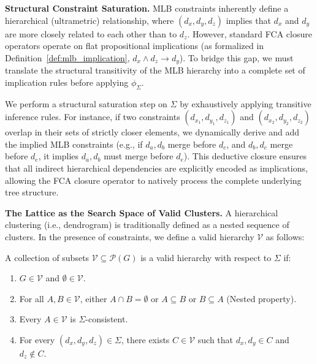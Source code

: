 \textbf{Structural Constraint Saturation.} 
MLB constraints inherently define a hierarchical (ultrametric) relationship, where $(d_x,d_y,d_z)$ implies that $d_x$ and $d_y$ are more closely related to each other than to $d_z$. However, standard FCA closure operators operate on flat propositional implications (as formalized in Definition~\eqref{def:mlb_implication}, $d_x \land d_z \rightarrow d_y$). To bridge this gap, we must translate the structural transitivity of the MLB hierarchy into a complete set of implication rules before applying $\phi_\Sigma$. 

We perform a structural saturation step on $\Sigma$ by exhaustively applying transitive inference rules. For instance, if two constraints $(d_{x_1}, d_{y_1}, d_{z_1})$ and $(d_{x_2}, d_{y_2}, d_{z_2})$ overlap in their sets of strictly closer elements, we dynamically derive and add the implied MLB constraints (e.g., if $d_{a}, d_{b}$ merge before $d_{c}$, and $d_{b}, d_{c}$ merge before $d_{e}$, it implies $d_{a}, d_{b}$ must merge before $d_{e}$). This deductive closure ensures that all indirect hierarchical dependencies are explicitly encoded as implications, allowing the FCA closure operator to natively process the complete underlying tree structure.

\textbf{The Lattice as the Search Space of Valid Clusters.} 
A hierarchical clustering (i.e., dendrogram) is traditionally defined as a nested sequence of clusters.
In the presence of constraints, we define a valid hierarchy $\mathcal{V}$ as follows:

\begin{definition}[Valid Hierarchy] %
    \label{def:valid_hierarchy}
A collection of subsets $\mathcal{V} \subseteq \mathcal{P}(G)$ is a valid hierarchy with respect to $\Sigma$ if: 
\begin{enumerate}
    \item \label{item:valid_hierarchy_root} 
    $G \in \mathcal{V}$ and $\emptyset \in \mathcal{V}$.

    \item \label{item:valid_hierarchy_nested} 
    For all $A, B \in \mathcal{V}$, either $A \cap B = \emptyset$ or $A \subseteq B$ or $B \subseteq A$ (Nested property).
    
    \item \label{item:valid_hierarchy_consistency} 
    Every $A \in \mathcal{V}$ is $\Sigma$-consistent.

    \item \label{item:valid_hierarchy_counterexample}
    For every $(d_x, d_y, d_z) \in \Sigma$, there exists $C \in \mathcal{V}$ such that $d_x, d_y \in C$ and $d_z \notin C$.
\end{enumerate}
\end{definition}

